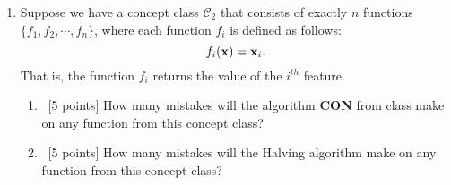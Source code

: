 \begin{enumerate}
\begin{enumerate}
  \end{enumerate}

\item Suppose we have a concept class $\mathcal{C}_2$ that consists
  of exactly $n$ functions $\{f_1, f_2, \cdots, f_n\}$, where each
  function $f_i$ is defined as follows:
  \begin{equation*}
    f_i({\bf x}) = {\bf x}_i.
  \end{equation*}
  That is, the function $f_i$ returns the value of the $i^{th}$
  feature.
  
  \begin{enumerate}
  \item~[5 points] How many mistakes will the algorithm
    \textbf{CON} from class make on any function from this concept
    class?
  \item~[5 points] How many mistakes will the Halving algorithm make
    on any function from this concept class?
  \end{enumerate}
  
\end{enumerate}



